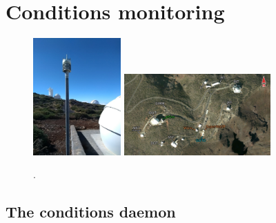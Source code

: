 \section{Conditions monitoring}
\label{sec:conditions}
\begin{colsection}


\begin{colsection}


\begin{figure}[t]
    \begin{center}
        \includegraphics[width=0.3\textwidth]{images/conditions_photo.jpg}
        \includegraphics[width=0.5\textwidth]{images/orm_east_labelled.png}
    \end{center}
    \caption[]{
        .
    }\label{fig:conditions}
\end{figure}

\end{colsection}

\subsection{The conditions daemon}
\label{sec:conditions_daemon}
\begin{colsection}


\end{colsection}
\end{colsection}
